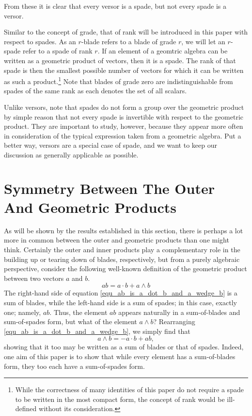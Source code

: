 \documentclass{birkjour}
\theoremstyle{definition}
\theoremstyle{remark}
\numberwithin{equation}{section}
\begin{document}
From these it is clear that every versor is a spade, but not every spade is a versor.

Similar to the concept of grade, that of rank will be introduced in this paper with respect to spades.  As an $r$-blade
refers to a blade of grade $r$, we will let an $r$-spade refer to a spade of rank $r$.  If an element of a geomtric
algebra can be written as a geometric product of vectors, then it is a spade.  The rank of that spade is then the smallest
possible number of vectors for which it can be written as such a product.\footnote{While the correctness of many identities of this paper
do not require a spade to be written in the most compact form, the concept of rank would be ill-defined without its consideration.}   Note that blades of grade zero
are indistinguishable from spades of the same rank as each denotes the set of all scalars.

Unlike versors, note that spades do not form a group over the geometric product by simple reason that not every
spade is invertible with respect to the geometric product.  They are important to study, however,
because they appear more often in consideration of the typical expression taken from a geometric algebra.
Put a better way, versors are a special case of spade, and we want to keep our discussion as generally applicable as possible.

\section{Symmetry Between The Outer And Geometric Products}

As will be shown by the results established in this section, there is perhaps a lot more in
common between the outer and geometric products than one might think.  Certainly the outer and
inner products play a complementary role in the building up or tearing down of blades, respectively, but from a
purely algebraic perspective, consider the following well-known definition of the geometric product
between two vectors $a$ and $b$.
\begin{equation}\label{equ_ab_is_a_dot_b_and_a_wedge_b}
ab = a\cdot b + a\wedge b
\end{equation}
The right-hand side of equation \eqref{equ_ab_is_a_dot_b_and_a_wedge_b} is a sum of blades, while the left-hand side is a sum of spades;
in this case, exactly one; namely, $ab$.  Thus, the element $ab$ appears naturally in a sum-of-blades and
sum-of-spades form, but what of the element $a\wedge b$?  Rearranging \eqref{equ_ab_is_a_dot_b_and_a_wedge_b}, we simply find that
\begin{equation}\label{equ_a_wedge_b_is_neg_a_dot_b_and_ab}
a\wedge b = -a\cdot b + ab,
\end{equation}
showing that it too may be written as a sum of blades or that of spades.  Indeed, one aim of this paper
is to show that while every element has a sum-of-blades form, they too each have a sum-of-spades form.
\end{document}
